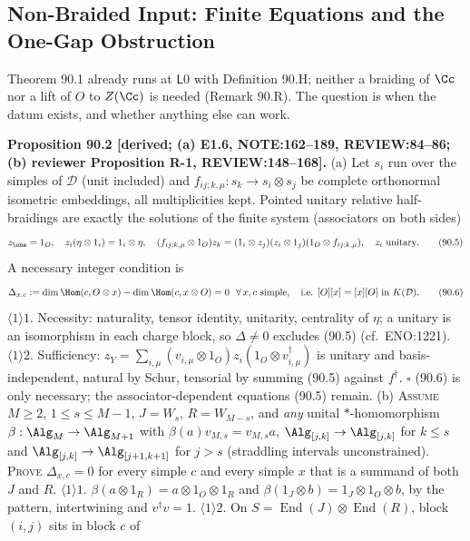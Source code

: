 \subsection{Non-Braided Input: Finite Equations and the One-Gap Obstruction}

Theorem 90.1 already runs at \(\mathsf L0\) with Definition 90.H; neither a braiding of \(\Cc\) nor a lift of \(O\) to
\(Z(\Cc)\) is needed (Remark 90.R).  The question is when the datum exists, and whether anything else can work.

\textbf{Proposition 90.2 [derived; (a) E1.6, NOTE:162--189, REVIEW:84--86; (b) reviewer Proposition R-1,
REVIEW:148--168].}  (a) Let \(s_i\) run over the simples of \(\mathcal D\) (unit included) and
\(f_{ij;k,\mu}:s_k\to s_i\otimes s_j\) be complete orthonormal isometric embeddings, all multiplicities kept.  Pointed
unitary relative half-braidings are exactly the solutions of the finite system (associators on both sides)
\[
 z_\one=1_O,\quad z_i(\eta\otimes1_i)=1_i\otimes\eta,\quad
 (f_{ij;k,\mu}\otimes1_O)z_k=(1_i\otimes z_j)(z_i\otimes1_j)(1_O\otimes f_{ij;k,\mu}),\quad z_i\text{ unitary}. \tag{90.5}
\]
A necessary integer condition is
\[
 \Delta_{x,c}:=\dim\Hom(c,O\otimes x)-\dim\Hom(c,x\otimes O)=0\ \ \forall\,x,c\ \text{simple},
 \quad\text{i.e. } [O][x]=[x][O]\ \text{in } K(\mathcal D). \tag{90.6}
\]
\(\langle1\rangle1\). Necessity: naturality, tensor identity, unitarity, centrality of \(\eta\); a unitary is an isomorphism in
each charge block, so \(\Delta\ne0\) excludes (90.5) (cf.\ ENO:1221).
\(\langle1\rangle2\). Sufficiency: \(z_Y=\sum_{i,\mu}(v_{i,\mu}\otimes1_O)z_i(1_O\otimes v_{i,\mu}^\dagger)\) is unitary and
basis-independent, natural by Schur, tensorial by summing (90.5) against \(f^\dagger\).  \(\square\)  (90.6) is only
necessary; the associator-dependent equations (90.5) remain.
(b) \textsc{Assume} \(M\ge2\), \(1\le s\le M-1\), \(J=W_s\), \(R=W_{M-s}\), and \emph{any} unital \(*\)-homomorphism
\(\beta:\Alg_M\to\Alg_{M+1}\) with \(\beta(a)v_{M,s}=v_{M,s}a\), \(\Alg_{[j,k]}\to\Alg_{[j,k]}\) for \(k\le s\) and
\(\Alg_{[j,k]}\to\Alg_{[j+1,k+1]}\) for \(j>s\) (straddling intervals unconstrained).  \textsc{Prove} \(\Delta_{x,c}=0\) for every
simple \(c\) and every simple \(x\) that is a summand of both \(J\) and \(R\).
\(\langle1\rangle1\). \(\beta(a\otimes1_R)=a\otimes1_O\otimes1_R\) and \(\beta(1_J\otimes b)=1_J\otimes1_O\otimes b\), by the
pattern, intertwining and \(v^\dagger v=1\).
\(\langle1\rangle2\). On \(S=\operatorname{End}(J)\otimes\operatorname{End}(R)\), block \((i,j)\) sits in block \(c\) of
